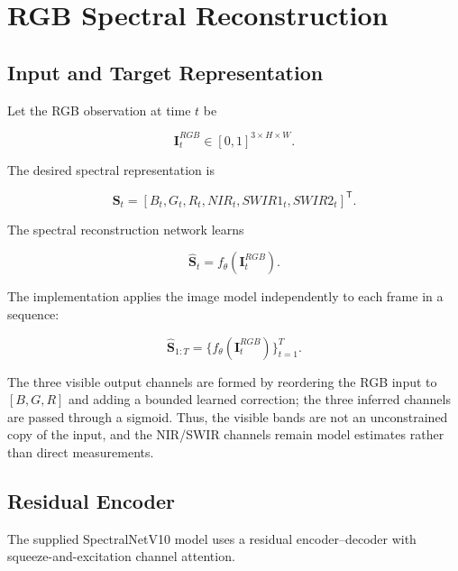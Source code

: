 \documentclass[11pt,a4paper]{article}
\newcommand{\vect}[1]{\bm{#1}}
\begin{document}

\section{RGB Spectral Reconstruction}

\subsection{Input and Target Representation}

Let the RGB observation at time $t$ be

\begin{equation}
\vect{I}^{RGB}_t
\in
[0,1]^{3\times H\times W}.
\end{equation}

The desired spectral representation is

\begin{equation}
\vect{S}_t
=
[
B_t,
G_t,
R_t,
NIR_t,
SWIR1_t,
SWIR2_t
]^{\mathsf T}.
\end{equation}

The spectral reconstruction network learns

\begin{equation}
\hat{\vect{S}}_t
=
f_\theta
\left(
\vect{I}^{RGB}_t
\right).
\end{equation}

The implementation applies the image model independently to each
frame in a sequence:

\begin{equation}
\hat{\vect{S}}_{1:T}
=
\{f_\theta(\vect{I}^{RGB}_t)\}_{t=1}^{T}.
\end{equation}

The three visible output channels are formed by reordering the RGB
input to $[B,G,R]$ and adding a bounded learned correction; the three
inferred channels are passed through a sigmoid. Thus, the visible bands
are not an unconstrained copy of the input, and the NIR/SWIR channels
remain model estimates rather than direct measurements.

\subsection{Residual Encoder}

The supplied SpectralNetV10 model uses a residual encoder--decoder
with squeeze-and-excitation channel attention.
\end{document}
